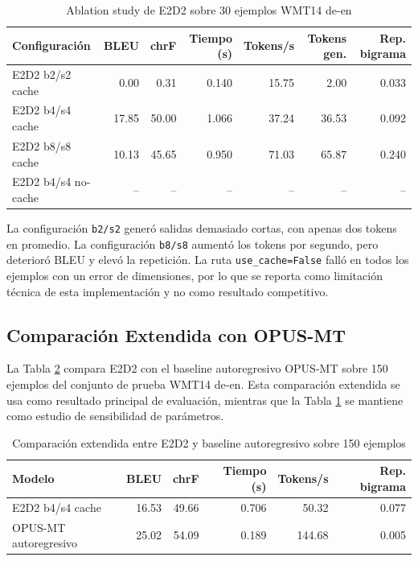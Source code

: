 \documentclass[conference]{IEEEtran}
\begin{document}
\begin{table}[htbp]
\caption{Ablation study de E2D2 sobre 30 ejemplos WMT14 de-en}
\label{tab:ablation}
\centering
\begin{tabular}{lrrrrrr}
\toprule
\textbf{Configuración} & \textbf{BLEU} & \textbf{chrF} & \textbf{Tiempo (s)} & \textbf{Tokens/s} & \textbf{Tokens gen.} & \textbf{Rep. bigrama} \\
\midrule
E2D2 b2/s2 cache & 0.00 & 0.31 & 0.140 & 15.75 & 2.00 & 0.033 \\
E2D2 b4/s4 cache & 17.85 & 50.00 & 1.066 & 37.24 & 36.53 & 0.092 \\
E2D2 b8/s8 cache & 10.13 & 45.65 & 0.950 & 71.03 & 65.87 & 0.240 \\
E2D2 b4/s4 no-cache & -- & -- & -- & -- & -- & -- \\
\bottomrule
\end{tabular}
\end{table}

La configuración \texttt{b2/s2} generó salidas demasiado cortas, con apenas dos tokens en promedio. La configuración \texttt{b8/s8} aumentó los tokens por segundo, pero deterioró BLEU y elevó la repetición. La ruta \texttt{use\_cache=False} falló en todos los ejemplos con un error de dimensiones, por lo que se reporta como limitación técnica de esta implementación y no como resultado competitivo.

\subsection{Comparación Extendida con OPUS-MT}

La Tabla \ref{tab:comparacion} compara E2D2 con el baseline autoregresivo OPUS-MT sobre 150 ejemplos del conjunto de prueba WMT14 de-en. Esta comparación extendida se usa como resultado principal de evaluación, mientras que la Tabla \ref{tab:ablation} se mantiene como estudio de sensibilidad de parámetros.

\begin{table}[htbp]
\caption{Comparación extendida entre E2D2 y baseline autoregresivo sobre 150 ejemplos}
\label{tab:comparacion}
\centering
\begin{tabular}{lrrrrr}
\toprule
\textbf{Modelo} & \textbf{BLEU} & \textbf{chrF} & \textbf{Tiempo (s)} & \textbf{Tokens/s} & \textbf{Rep. bigrama} \\
\midrule
E2D2 b4/s4 cache & 16.53 & 49.66 & 0.706 & 50.32 & 0.077 \\
OPUS-MT autoregresivo & 25.02 & 54.09 & 0.189 & 144.68 & 0.005 \\
\bottomrule
\end{tabular}
\end{table}
\end{document}
